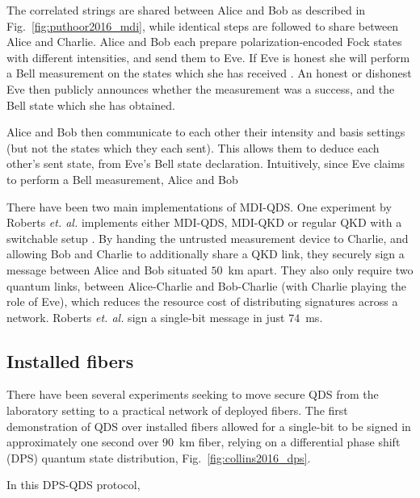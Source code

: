 The correlated strings are shared between Alice and Bob as described in Fig.~\ref{fig:puthoor2016_mdi}, while identical steps are followed to share between Alice and Charlie. Alice and Bob each prepare polarization-encoded Fock states with different intensities, and send them to Eve. If Eve is honest she will perform a Bell measurement  on the states which she has received \cite{Nielsen2010}. An honest or dishonest Eve then publicly announces whether the measurement was a success, and the Bell state which she has obtained.

Alice and Bob then communicate to each other their intensity and basis settings (but not the states which they each sent). This allows them to deduce each other's sent state, from Eve's Bell state declaration. Intuitively, since Eve claims to perform a Bell measurement, Alice and Bob 



There have been two main implementations of MDI-QDS. One experiment by Roberts \emph{et. al.} implements either MDI-QDS, MDI-QKD or regular QKD with a switchable setup \cite{Roberts2017}. By handing the untrusted measurement device to Charlie, and allowing Bob and Charlie to additionally share a QKD link, they securely sign a message between Alice and Bob situated $50$~km apart. They also only require two quantum links, between Alice-Charlie and Bob-Charlie (with Charlie playing the role of Eve), which reduces the resource cost of distributing signatures across a network. Roberts \emph{et. al.} sign a single-bit message in just $74$~ms. %



\subsection{Installed fibers}
There have been several experiments seeking to move secure QDS from the laboratory setting to a practical network of deployed fibers. The first demonstration of QDS over installed fibers allowed for a single-bit to be signed in approximately one second over $90$~km fiber, relying on a differential phase shift (DPS) quantum state distribution, Fig.~\ref{fig:collins2016_dps}.

In this DPS-QDS protocol,  

